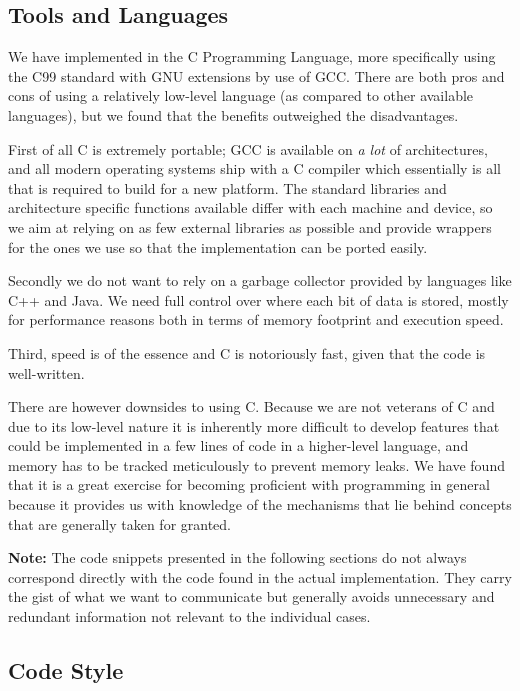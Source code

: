 \subsection{Tools and Languages}

We have implemented \thename{} in the C Programming Language, more specifically
using the C99 standard with GNU extensions by use of GCC\cite{gnu:gcc}. There
are both pros and cons of using a relatively low-level language (as compared to
other available languages), but we found that the benefits outweighed the
disadvantages.

First of all C is extremely portable; GCC is available on \textit{a lot} of
architectures, and all modern operating systems ship with a C compiler which
essentially is all that is required to build \thename{} for a new platform. The
standard libraries and architecture specific functions available differ with
each machine and device, so we aim at relying on as few external libraries as
possible and provide wrappers for the ones we use so that the implementation can
be ported easily.

Secondly we do not want to rely on a garbage collector provided by languages
like C++ and Java. We need full control over where each bit of data is stored,
mostly for performance reasons both in terms of memory footprint and execution
speed.

Third, speed is of the essence and C is notoriously fast, given that the code is
well-written.

There are however downsides to using C. Because we are not veterans of C and due
to its low-level nature it is inherently more difficult to develop features that
could be implemented in a few lines of code in a higher-level language, and
memory has to be tracked meticulously to prevent memory leaks. We have found
that it is a great exercise for becoming proficient with programming in general
because it provides us with knowledge of the mechanisms that lie behind concepts
that are generally taken for granted.

\textbf{Note:} The code snippets presented in the following sections do not
always correspond directly with the code found in the actual
implementation. They carry the gist of what we want to communicate but generally
avoids unnecessary and redundant information not relevant to the individual
cases.

\subsection{Code Style}

